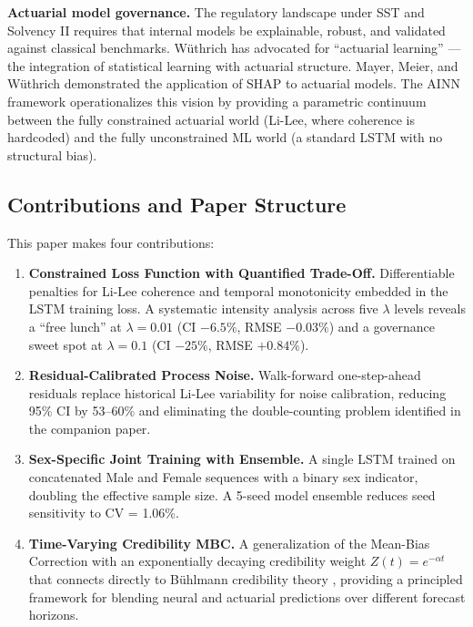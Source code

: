 \documentclass[11pt,a4paper]{article}
\begin{document}
\textbf{Actuarial model governance.} The regulatory landscape under SST \cite{swissre2022} and Solvency II requires that internal models be explainable, robust, and validated against classical benchmarks. W\"uthrich \cite{wuthrich2021statistical} has advocated for ``actuarial learning'' --- the integration of statistical learning with actuarial structure. Mayer, Meier, and W\"uthrich \cite{shapforactuaries2023} demonstrated the application of SHAP to actuarial models. The AINN framework operationalizes this vision by providing a parametric continuum between the fully constrained actuarial world (Li-Lee, where coherence is hardcoded) and the fully unconstrained ML world (a standard LSTM with no structural bias).

\subsection{Contributions and Paper Structure}

This paper makes four contributions:
\begin{enumerate}
    \item \textbf{Constrained Loss Function with Quantified Trade-Off.} Differentiable penalties for Li-Lee coherence and temporal monotonicity embedded in the LSTM training loss. A systematic intensity analysis across five $\lambda$ levels reveals a ``free lunch'' at $\lambda = 0.01$ (CI $-6.5\%$, RMSE $-0.03\%$) and a governance sweet spot at $\lambda = 0.1$ (CI $-25\%$, RMSE $+0.84\%$).
    \item \textbf{Residual-Calibrated Process Noise.} Walk-forward one-step-ahead residuals replace historical Li-Lee variability for noise calibration, reducing 95\% CI by 53--60\% and eliminating the double-counting problem identified in the companion paper.
    \item \textbf{Sex-Specific Joint Training with Ensemble.} A single LSTM trained on concatenated Male and Female sequences with a binary sex indicator, doubling the effective sample size. A 5-seed model ensemble reduces seed sensitivity to CV = 1.06\%.
    \item \textbf{Time-Varying Credibility MBC.} A generalization of the Mean-Bias Correction with an exponentially decaying credibility weight $Z(t) = e^{-\alpha t}$ that connects directly to B\"uhlmann credibility theory \cite{buhlmann1967}, providing a principled framework for blending neural and actuarial predictions over different forecast horizons.
\end{enumerate}
\end{document}
